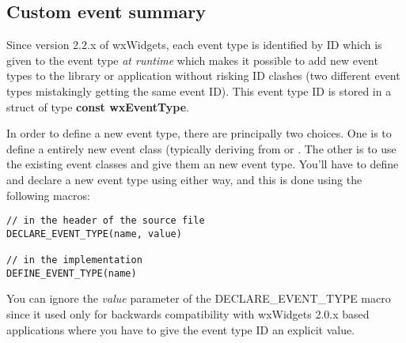 \begin{twocollist}
\end{twocollist}

\subsection{Custom event summary}\label{customevents}


Since version 2.2.x of wxWidgets, each event type is identified by ID which
is given to the event type {\it at runtime} which makes it possible to add
new event types to the library or application without risking ID clashes
(two different event types mistakingly getting the same event ID). This
event type ID is stored in a struct of type {\bf const wxEventType}.

In order to define a new event type, there are principally two choices.
One is to define a entirely new event class (typically deriving from
 or . 
The other is to use the existing event classes and give them an new event
type. You'll have to define and declare a new event type using either way,
and this is done using the following macros:

\begin{verbatim}
// in the header of the source file
DECLARE_EVENT_TYPE(name, value)

// in the implementation
DEFINE_EVENT_TYPE(name)
\end{verbatim}

You can ignore the {\it value} parameter of the DECLARE\_EVENT\_TYPE macro
since it used only for backwards compatibility with wxWidgets 2.0.x based
applications where you have to give the event type ID an explicit value.

